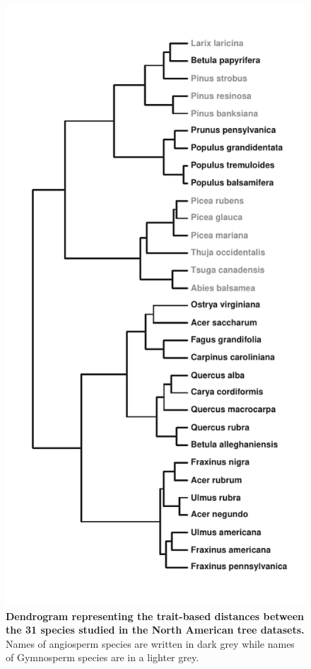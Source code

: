\begin{figure}
\centering
\includegraphics{chapitre3/figS2.pdf}
\caption{\textbf{Dendrogram representing the trait-based distances
between the 31 species studied in the North American tree datasets.}
Names of angiosperm species are written in dark grey while names of
Gymnosperm species are in a lighter grey.\label{fig:dendro}}
\end{figure}

